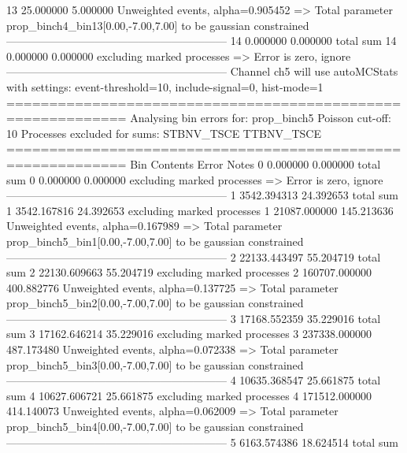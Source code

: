 13         25.000000       5.000000        Unweighted events, alpha=0.905452
  => Total parameter prop_binch4_bin13[0.00,-7.00,7.00] to be gaussian constrained
------------------------------------------------------------
14         0.000000        0.000000        total sum                     
14         0.000000        0.000000        excluding marked processes    
  => Error is zero, ignore      
------------------------------------------------------------
Channel ch5 will use autoMCStats with settings: event-threshold=10, include-signal=0, hist-mode=1
============================================================
Analysing bin errors for: prop_binch5
Poisson cut-off: 10
Processes excluded for sums: STBNV_TSCE TTBNV_TSCE
============================================================
Bin        Contents        Error           Notes                         
0          0.000000        0.000000        total sum                     
0          0.000000        0.000000        excluding marked processes    
  => Error is zero, ignore      
------------------------------------------------------------
1          3542.394313     24.392653       total sum                     
1          3542.167816     24.392653       excluding marked processes    
1          21087.000000    145.213636      Unweighted events, alpha=0.167989
  => Total parameter prop_binch5_bin1[0.00,-7.00,7.00] to be gaussian constrained
------------------------------------------------------------
2          22133.443497    55.204719       total sum                     
2          22130.609663    55.204719       excluding marked processes    
2          160707.000000   400.882776      Unweighted events, alpha=0.137725
  => Total parameter prop_binch5_bin2[0.00,-7.00,7.00] to be gaussian constrained
------------------------------------------------------------
3          17168.552359    35.229016       total sum                     
3          17162.646214    35.229016       excluding marked processes    
3          237338.000000   487.173480      Unweighted events, alpha=0.072338
  => Total parameter prop_binch5_bin3[0.00,-7.00,7.00] to be gaussian constrained
------------------------------------------------------------
4          10635.368547    25.661875       total sum                     
4          10627.606721    25.661875       excluding marked processes    
4          171512.000000   414.140073      Unweighted events, alpha=0.062009
  => Total parameter prop_binch5_bin4[0.00,-7.00,7.00] to be gaussian constrained
------------------------------------------------------------
5          6163.574386     18.624514       total sum                     
